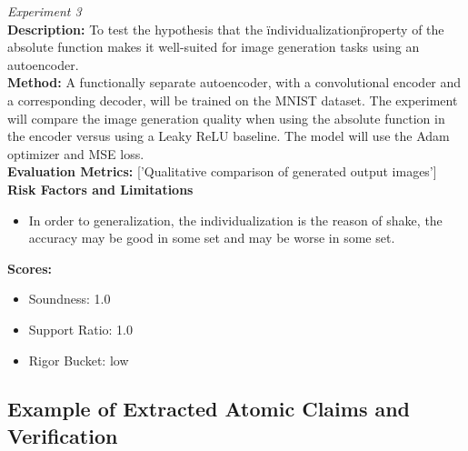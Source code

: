 \begin{tcolorbox}[title=\textbf{Example: Low-Soundness Proposal}]
\vspace{0.5em}
\textit{Experiment 3} \\
\textbf{Description:} To test the hypothesis that the \"individualization\" property of the absolute function makes it well-suited for image generation tasks using an autoencoder. \\
\textbf{Method:} A functionally separate autoencoder, with a convolutional encoder and a corresponding decoder, will be trained on the MNIST dataset. The experiment will compare the image generation quality when using the absolute function in the encoder versus using a Leaky ReLU baseline. The model will use the Adam optimizer and MSE loss. \\
\textbf{Evaluation Metrics:} ['Qualitative comparison of generated output images'] \\

\textbf{Risk Factors and Limitations}
\begin{itemize}
\item In order to generalization, the individualization is the reason of shake, the accuracy may be good in some set and may be worse in some set.
\end{itemize} 

\textbf{Scores:}
\begin{itemize}
  \item Soundness: 1.0
  \item Support Ratio: 1.0
  \item Rigor Bucket: low
\end{itemize}

\end{tcolorbox}

\subsection{Example of Extracted Atomic Claims and Verification}\label{sec:supp:atomic-example}


